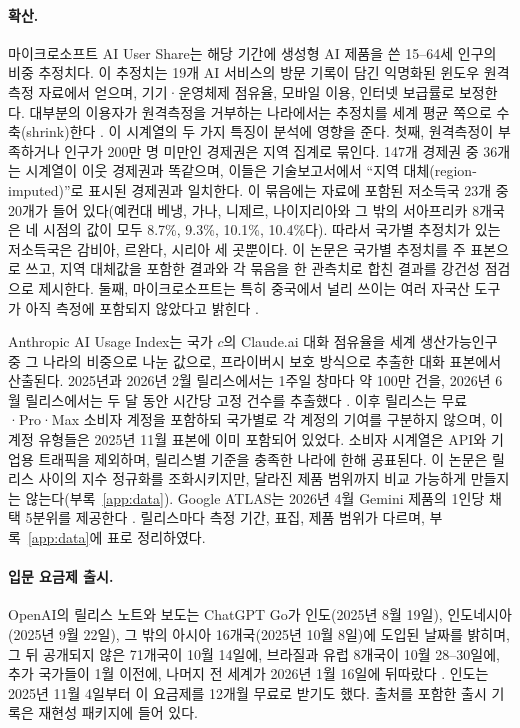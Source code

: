 \documentclass[11pt]{article}
\theoremstyle{definition}
\theoremstyle{remark}
\begin{document}
\paragraph{확산.} 마이크로소프트 AI User Share는 해당 기간에 생성형 AI 제품을 쓴 15--64세 인구의 비중 추정치다. 이 추정치는 19개 AI 서비스의 방문 기록이 담긴 익명화된 윈도우 원격측정 자료에서 얻으며, 기기·운영체제 점유율, 모바일 이용, 인터넷 보급률로 보정한다. 대부분의 이용자가 원격측정을 거부하는 나라에서는 추정치를 세계 평균 쪽으로 수축(shrink)한다 \citep{misra2025measuring}. 이 시계열의 두 가지 특징이 분석에 영향을 준다. 첫째, 원격측정이 부족하거나 인구가 200만 명 미만인 경제권은 지역 집계로 묶인다. 147개 경제권 중 36개는 시계열이 이웃 경제권과 똑같으며, 이들은 기술보고서에서 ``지역 대체(region-imputed)''로 표시된 경제권과 일치한다. 이 묶음에는 자료에 포함된 저소득국 23개 중 20개가 들어 있다(예컨대 베냉, 가나, 니제르, 나이지리아와 그 밖의 서아프리카 8개국은 네 시점의 값이 모두 8.7\%, 9.3\%, 10.1\%, 10.4\%다). 따라서 국가별 추정치가 있는 저소득국은 감비아, 르완다, 시리아 세 곳뿐이다. 이 논문은 국가별 추정치를 주 표본으로 쓰고, 지역 대체값을 포함한 결과와 각 묶음을 한 관측치로 합친 결과를 강건성 점검으로 제시한다. 둘째, 마이크로소프트는 특히 중국에서 널리 쓰이는 여러 자국산 도구가 아직 측정에 포함되지 않았다고 밝힌다 \citep{microsoft2026q2}.

Anthropic AI Usage Index는 국가 $c$의 Claude.ai 대화 점유율을 세계 생산가능인구 중 그 나라의 비중으로 나눈 값으로, 프라이버시 보호 방식으로 추출한 대화 표본에서 산출된다. 2025년과 2026년 2월 릴리스에서는 1주일 창마다 약 100만 건을, 2026년 6월 릴리스에서는 두 달 동안 시간당 고정 건수를 추출했다 \citep{handa2025which,appel2025uneven,appel2026primitives}. 이후 릴리스는 무료·Pro·Max 소비자 계정을 포함하되 국가별로 각 계정의 기여를 구분하지 않으며, 이 계정 유형들은 2025년 11월 표본에 이미 포함되어 있었다. 소비자 시계열은 API와 기업용 트래픽을 제외하며, 릴리스별 기준을 충족한 나라에 한해 공표된다. 이 논문은 릴리스 사이의 지수 정규화를 조화시키지만, 달라진 제품 범위까지 비교 가능하게 만들지는 않는다(부록~\ref{app:data}). Google ATLAS는 2026년 4월 Gemini 제품의 1인당 채택 5분위를 제공한다 \citep{iscenko2026atlas}. 릴리스마다 측정 기간, 표집, 제품 범위가 다르며, 부록~\ref{app:data}에 표로 정리하였다.

\paragraph{입문 요금제 출시.} OpenAI의 릴리스 노트와 보도는 ChatGPT Go가 인도(2025년 8월 19일), 인도네시아(2025년 9월 22일), 그 밖의 아시아 16개국(2025년 10월 8일)에 도입된 날짜를 밝히며, 그 뒤 공개되지 않은 71개국이 10월 14일에, 브라질과 유럽 8개국이 10월 28--30일에, 추가 국가들이 1월 이전에, 나머지 전 세계가 2026년 1월 16일에 뒤따랐다 \citep{openai2026go,openai2025gorollout,techcrunch2025go}. 인도는 2025년 11월 4일부터 이 요금제를 12개월 무료로 받기도 했다. 출처를 포함한 출시 기록은 재현성 패키지에 들어 있다.
\end{document}
